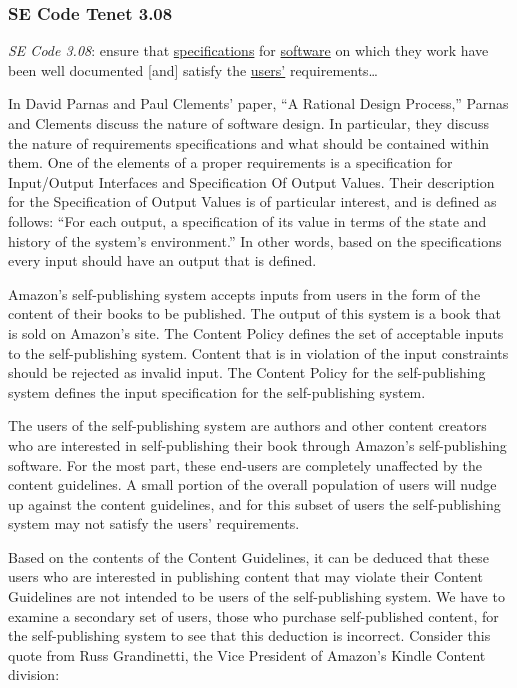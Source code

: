 \documentclass[11pt]{article}
\begin{document}
\begin{multicols}{2}
\subsubsection{SE Code Tenet 3.08}

\emph{SE Code 3.08}: ensure that \underline{specifications} for \underline{software} on which they work have been well documented [and] satisfy the \underline{users'} requirements\ldots 

In David Parnas and Paul Clements' paper, ``A Rational Design Process,'' Parnas and Clements discuss the nature of software design. \cite{fakeit} In particular, they discuss the nature of requirements specifications and what should be contained within them.  One of the elements of a proper requirements is a specification for Input/Output Interfaces and Specification Of Output Values.  Their description for the Specification of Output Values is of particular interest, and is defined as follows: ``For each output, a specification of its value in terms of the state and history of the system's environment.'' \cite{fakeit} In other words, based on the specifications every input should have an output that is defined. 

Amazon's self-publishing system accepts inputs from users in the form of the content of their books to be published.  The output of this system is a book that is sold on Amazon's site.  The Content Policy defines the set of acceptable inputs to the self-publishing system.  Content that is in violation of the input constraints should be rejected as invalid input.  The Content Policy for the self-publishing system defines the input specification for the self-publishing system. 

The users of the self-publishing system are authors and other content creators who are interested in self-publishing their book through Amazon's self-publishing software.  For the most part, these end-users are completely unaffected by the content guidelines.  A small portion of the overall population of users will nudge up against the content guidelines, and for this subset of users the self-publishing system may not satisfy the users' requirements.

Based on the contents of the Content Guidelines, it can be deduced that these users who are interested in publishing content that may violate their Content Guidelines are not intended to be users of the self-publishing system.  We have to examine a secondary set of users, those who purchase self-published content, for the self-publishing system to see that this deduction is incorrect.  Consider this quote from Russ Grandinetti, the Vice President of Amazon's Kindle Content division:


\end{multicols}
\end{document}
